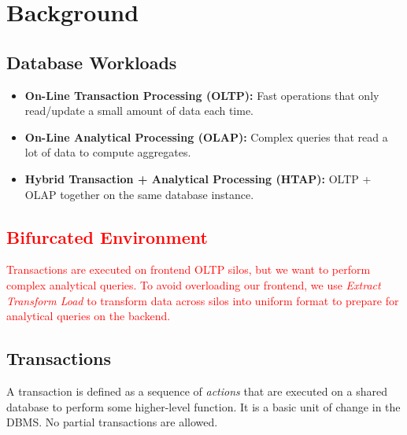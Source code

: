 \documentclass[11pt]{article}
\newcommand{\rr}[1]{\textcolor{red}{#1}}
\begin{document}
\maketitle
\thispagestyle{plain}

\section{Background}

\subsection*{Database Workloads}

\begin{itemize}
    \item \textbf{On-Line Transaction Processing (OLTP):}
    Fast operations that only read/update a small amount of data each time.
    
    \item \textbf{On-Line Analytical Processing (OLAP):}
    Complex queries that read a lot of data to compute aggregates.
    
    \item \textbf{Hybrid Transaction + Analytical Processing (HTAP):}
    OLTP + OLAP together on the same database instance.
\end{itemize}
\rr{\subsection*{Bifurcated Environment}
Transactions are executed on frontend OLTP silos, but we want to perform complex analytical queries. To avoid overloading our frontend, we use \textit{Extract Transform Load} to transform data across silos into uniform format to prepare for analytical queries on the backend.}

\subsection*{Transactions}

A transaction is defined as a sequence of \textit{actions} that are executed on a shared database to 
perform some higher-level function. It is a basic unit of change in the DBMS. No partial 
transactions are allowed.
\end{document}
